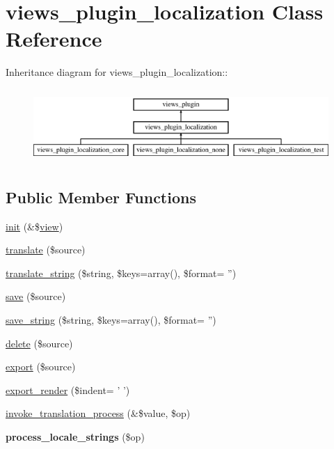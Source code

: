 \hypertarget{classviews__plugin__localization}{
\section{views\_\-plugin\_\-localization Class Reference}
\label{classviews__plugin__localization}
}
Inheritance diagram for views\_\-plugin\_\-localization::\begin{figure}[H]
\begin{center}
\leavevmode
\includegraphics[height=2.82828cm]{classviews__plugin__localization}
\end{center}
\end{figure}
\subsection*{Public Member Functions}
\begin{DoxyCompactItemize}
\item 
\hyperlink{classviews__plugin__localization_a13d9223bcdd7447518dd44e3d5b5e0f4}{init} (\&\$\hyperlink{classview}{view})
\item 
\hyperlink{classviews__plugin__localization_a56b08b27d30b9061c3c9a51993fe4159}{translate} (\$source)
\item 
\hyperlink{classviews__plugin__localization_a5c8353f0c80d4cf160e36133316f0a59}{translate\_\-string} (\$string, \$keys=array(), \$format= '')
\item 
\hyperlink{classviews__plugin__localization_a28f6f39bb83c3379d123e039287f50ed}{save} (\$source)
\item 
\hyperlink{classviews__plugin__localization_ae3c306214c21380853b27eeb902cadac}{save\_\-string} (\$string, \$keys=array(), \$format= '')
\item 
\hyperlink{classviews__plugin__localization_a52726c9177d4dcf033ac81c8287bb5f6}{delete} (\$source)
\item 
\hyperlink{classviews__plugin__localization_a68c74a8cc99b0b52046064eac84cb07f}{export} (\$source)
\item 
\hyperlink{classviews__plugin__localization_ab53c5011e643fd284723970283c25d32}{export\_\-render} (\$indent= ' ')
\item 
\hyperlink{classviews__plugin__localization_a042053cc792cb7fbd04c7c0e3868fa3d}{invoke\_\-translation\_\-process} (\&\$value, \$op)
\item 
\hypertarget{classviews__plugin__localization_a204dc688e79af494ab21e7ad12477596}{
{\bfseries process\_\-locale\_\-strings} (\$op)}
\label{classviews__plugin__localization_a204dc688e79af494ab21e7ad12477596}

\end{DoxyCompactItemize}
